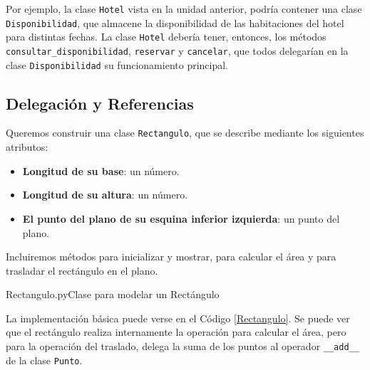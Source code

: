 Por ejemplo, la clase \lstinline!Hotel! vista en la unidad anterior, podría
contener una clase \lstinline!Disponibilidad!, que almacene la
disponibilidad de las habitaciones del hotel para distintas fechas.  La
clase \lstinline!Hotel! debería tener, entonces, los métodos
\lstinline!consultar_disponibilidad!, \lstinline!reservar! y
\lstinline!cancelar!, que todos delegarían en la clase
\lstinline!Disponibilidad! su funcionamiento principal.




\subsection*{Delegación y Referencias}

Queremos construir una clase \lstinline!Rectangulo!, que se describe
mediante los siguientes atributos:

\begin{itemize}
\item {\bf Longitud de su base}: un número.

\item {\bf Longitud de su altura}: un número.

\item {\bf El punto del plano de su esquina inferior izquierda}: un punto del plano.

\end{itemize}

Incluiremos métodos para inicializar y mostrar, para calcular el área y
para trasladar el rectángulo en el plano.

\begin{codigo}{Rectangulo.py}{Clase para modelar un Rectángulo}
\label{Rectangulo}

\end{codigo}

La implementación básica puede verse en el Código \ref{Rectangulo}.  Se
puede ver que el rectángulo realiza internamente la operación para calcular
el área, pero para la operación del traslado, delega la suma de los puntos
al operador \lstinline!__add__! de la clase \lstinline!Punto!.


